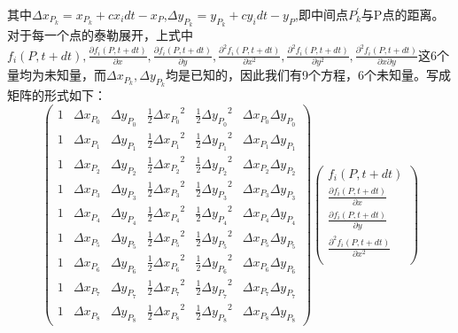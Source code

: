 \documentclass[UTF8]{ctexart}
\begin{document}
\indent 其中$\Delta x_{P_k}=x_{P_k}+cx_i dt - x_P$,$\Delta y_{P_k}=y_{P_k}+cy_i dt - y_P$,即中间点$P_k^\prime$与P点的距离。\\
\indent 对于每一个点的泰勒展开，上式中$f_i(P,t+dt), \frac{\partial f_i(P,t+dt)}{\partial x}, \frac{\partial f_i(P,t+dt)}{\partial y}, \frac{\partial^{2} f_i(P,t+dt)}{\partial x^{2}}, \frac{\partial^{2} f_i(P,t+dt)}{\partial y^{2}}, \frac{\partial^{2} f_i(P,t+dt)}{{\partial x} {\partial y}}$这6个量均为未知量，而$\Delta x_{P_k}, \Delta y_{P_k}$均是已知的，因此我们有9个方程，6个未知量。写成矩阵的形式如下：
\begin{equation}
{\begin{pmatrix}
1 & \Delta x_{P_0} & \Delta y_{P_0} & \frac{1}{2} {\Delta x_{P_0}}^2 & \frac{1}{2} {\Delta y_{P_0}}^2 & \Delta x_{P_0} \Delta y_{P_0} \\
1 & \Delta x_{P_1} & \Delta y_{P_1} & \frac{1}{2} {\Delta x_{P_1}}^2 & \frac{1}{2} {\Delta y_{P_1}}^2 & \Delta x_{P_1} \Delta y_{P_1} \\
1 & \Delta x_{P_2} & \Delta y_{P_2} & \frac{1}{2} {\Delta x_{P_2}}^2 & \frac{1}{2} {\Delta y_{P_2}}^2 & \Delta x_{P_2} \Delta y_{P_2} \\
1 & \Delta x_{P_3} & \Delta y_{P_3} & \frac{1}{2} {\Delta x_{P_3}}^2 & \frac{1}{2} {\Delta y_{P_3}}^2 & \Delta x_{P_3} \Delta y_{P_3} \\
1 & \Delta x_{P_4} & \Delta y_{P_4} & \frac{1}{2} {\Delta x_{P_4}}^2 & \frac{1}{2} {\Delta y_{P_4}}^2 & \Delta x_{P_4} \Delta y_{P_4} \\
1 & \Delta x_{P_5} & \Delta y_{P_5} & \frac{1}{2} {\Delta x_{P_5}}^2 & \frac{1}{2} {\Delta y_{P_5}}^2 & \Delta x_{P_5} \Delta y_{P_5} \\
1 & \Delta x_{P_6} & \Delta y_{P_6} & \frac{1}{2} {\Delta x_{P_6}}^2 & \frac{1}{2} {\Delta y_{P_6}}^2 & \Delta x_{P_6} \Delta y_{P_6} \\
1 & \Delta x_{P_7} & \Delta y_{P_7} & \frac{1}{2} {\Delta x_{P_7}}^2 & \frac{1}{2} {\Delta y_{P_7}}^2 & \Delta x_{P_7} \Delta y_{P_7} \\
1 & \Delta x_{P_8} & \Delta y_{P_8} & \frac{1}{2} {\Delta x_{P_8}}^2 & \frac{1}{2} {\Delta y_{P_8}}^2 & \Delta x_{P_8} \Delta y_{P_8}
\end{pmatrix}}
{\begin{pmatrix}
f_i(P,t+dt) \\
\frac{\partial f_i(P,t+dt)}{\partial x} \\
\frac{\partial f_i(P,t+dt)}{\partial y} \\
\frac{\partial^{2} f_i(P,t+dt)}{\partial x^{2}} \\

\end{pmatrix}}
\end{equation}
\end{document}
